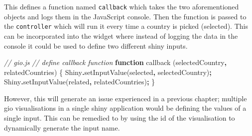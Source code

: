 \documentclass[
]{krantz}
\makeatletter
\newenvironment{Shaded}{\begin{snugshade}}{\end{snugshade}}
\newcommand{\CommentTok}[1]{\textcolor[rgb]{0.37,0.37,0.37}{\textit{#1}}}
\newcommand{\FunctionTok}[1]{\textcolor[rgb]{0,0,0}{#1}}
\newcommand{\KeywordTok}[1]{\textcolor[rgb]{0.27,0.27,0.27}{\textbf{#1}}}
\newcommand{\NormalTok}[1]{#1}
\newcommand{\OperatorTok}[1]{\textcolor[rgb]{0.43,0.43,0.43}{\textbf{#1}}}
\newcommand{\StringTok}[1]{\textcolor[rgb]{0.5,0.5,0.5}{#1}}
\newenvironment{kframe}{%
\medskip{}
\setlength{\fboxsep}{.8em}
 \def\at@end@of@kframe{}%
 \ifinner\ifhmode%
  \def\at@end@of@kframe{\end{minipage}}%
  \begin{minipage}{\columnwidth}%
 \fi\fi%
 \def\FrameCommand##1{\hskip\@totalleftmargin \hskip-\fboxsep
 \colorbox{shadecolor}{##1}\hskip-\fboxsep
     \hskip-\linewidth \hskip-\@totalleftmargin \hskip\columnwidth}%
 \MakeFramed {\advance\hsize-\width
   \@totalleftmargin\z@ \linewidth\hsize
   \@setminipage}}%
 {\par\unskip\endMakeFramed%
 \at@end@of@kframe}
\renewenvironment{Shaded}{\begin{kframe}}{\end{kframe}}
\makeatother
\begin{document}
This defines a function named \texttt{callback} which takes the two aforementioned objects and logs them in the JavaScript console. Then the function is passed to the \texttt{controller} which will run it every time a country is picked (selected). This can be incorporated into the widget where instead of logging the data in the console it could be used to define two different shiny inputs.

\begin{Shaded}
\begin{Highlighting}[]
\CommentTok{// gio.js}
\CommentTok{// define callback function}
\KeywordTok{function} \FunctionTok{callback}\NormalTok{ (selectedCountry}\OperatorTok{,}\NormalTok{ relatedCountries) \{}
\NormalTok{  Shiny}\OperatorTok{.}\FunctionTok{setInputValue}\NormalTok{(}\StringTok{\textquotesingle{}selected\textquotesingle{}}\OperatorTok{,}\NormalTok{ selectedCountry)}\OperatorTok{;}
\NormalTok{  Shiny}\OperatorTok{.}\FunctionTok{setInputValue}\NormalTok{(}\StringTok{\textquotesingle{}related\textquotesingle{}}\OperatorTok{,}\NormalTok{ relatedCountries)}\OperatorTok{;}
\NormalTok{\}}
\end{Highlighting}
\end{Shaded}

However, this will generate an issue experienced in a previous chapter; multiple gio visualisations in a single shiny application would be defining the values of a single input. This can be remedied to by using the id of the visualisation to dynamically generate the input name.
\end{document}
